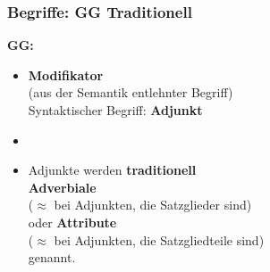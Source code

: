 \begin{frame}
\frametitle{Begriffe: GG \vs Traditionell}

	\begin{minipage}[b]{0.45\textwidth}
		\footnotesize
	\textbf{GG:}
		\begin{itemize}
		\item \textbf{Modifikator}\\
		(aus der Semantik entlehnter Begriff)\\
		Syntaktischer Begriff: \textbf{Adjunkt}
		\item[]
		\item Adjunkte werden \textbf{traditionell}\\
		\alert{\textbf{Adverbiale}}\\
		($\approx$ bei Adjunkten, die Satzglieder sind)\\
		oder \textbf{Attribute}\\
		($\approx$ bei Adjunkten, die Satzgliedteile sind)\\
		genannt.
		\end{itemize}	
  	\end{minipage}  
	\begin{minipage}[b]{0.5\textwidth}
	\centering
  	\end{minipage}

\end{frame}
%


